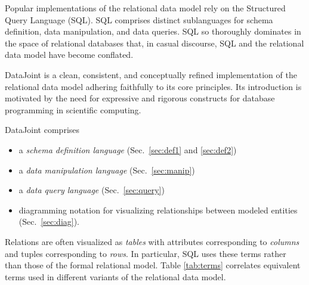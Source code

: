 \documentclass[letter,10pt]{article}
\newcommand{\datajoint}{DataJoint\xspace}
\begin{document}
Popular implementations of the relational data model rely on the Structured Query Language (SQL).
SQL comprises distinct sublanguages for schema definition, data manipulation, and data queries.
SQL so thoroughly dominates in the space of relational databases that, in casual discourse, SQL and the relational data model have become conflated. 

\datajoint is a clean, consistent, and conceptually refined implementation of the relational data model adhering faithfully to its core principles.
Its introduction is motivated by the need for expressive and rigorous  constructs for database programming in scientific computing.

\datajoint comprises 
\begin{itemize}
\item a \emph{schema definition language} (Sec.\ \ref{sec:def1} and \ref{sec:def2})
\item a \emph{data manipulation language} (Sec.\ \ref{sec:manip})
\item a \emph{data query language} (Sec.\ \ref{sec:query})
\item diagramming notation for visualizing relationships between modeled entities (Sec.\ \ref{sec:diag}).
\end{itemize}

Relations are often visualized as \emph{tables} with attributes corresponding to \emph{columns} and tuples corresponding to \emph{rows}.  
In particular, SQL uses these terms rather than those of the formal relational model.  
Table \ref{tab:terms} correlates equivalent terms used in different variants of the relational data model.
\end{document}

